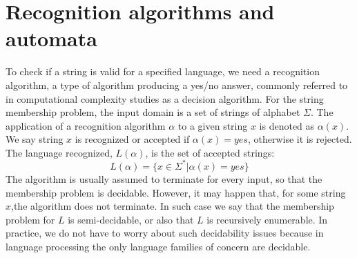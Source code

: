 \section{Recognition algorithms and automata}

To check if a string is valid for a specified language, we need a recognition algorithm, a type of algorithm producing a yes/no answer, commonly referred to in 
computational complexity studies as a decision algorithm. For the string membership problem, the input domain is a set of strings of alphabet $\Sigma$. The 
application of a recognition algorithm $\alpha$ to a given string $x$ is denoted as $\alpha(x)$. We say string $x$ is recognized or accepted if $\alpha(x)=yes$, 
otherwise it is rejected. The language recognized, $L(\alpha)$, is the set of accepted strings:
\[L(\alpha)=\{x \in \Sigma^{*}|\alpha(x)=yes\}\]
The algorithm is usually assumed to terminate for every input, so that the membership problem is decidable. However, it may happen that, for some string $x$,the 
algorithm does not terminate. In such case we say that the membership problem for $L$ is semi-decidable, or also that $L$ is recursively enumerable. In practice, 
we do not have to worry about such decidability issues because in language processing the only language families of concern are decidable. 

